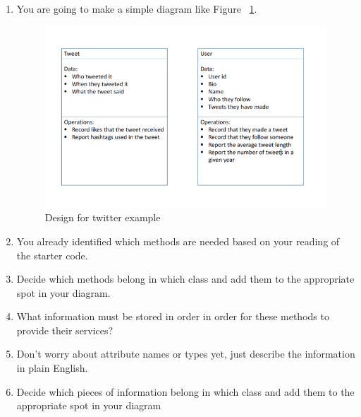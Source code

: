 \documentclass[12pt]{article}
\begin{document}
\begin{enumerate}[1.]
    \item You are going to make a simple diagram like Figure ~\ref{fig:uml}.

    \begin{figure}
        \begin{center}
        \includegraphics[width=0.8\linewidth]{../../images/lab_3/uml.png}
        \end{center}
        \caption{Design for twitter example}
        \label{fig:uml}
    \end{figure}

    \item You already identified which methods are needed based on your reading of the
    starter code.
    \item Decide which methods belong in which class and add them to the appropriate
    spot in your diagram.
    \item What information must be stored in order in order for these methods to provide
    their services?
    \item Don’t worry about attribute names or types yet, just describe the information
    in plain English.
    \item Decide which pieces of information belong in which class and add them to the
    appropriate spot in your diagram
\end{enumerate}
\end{document}
